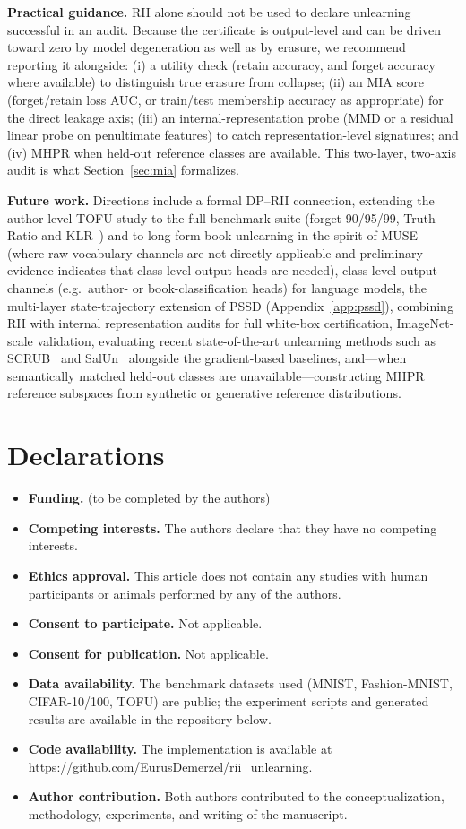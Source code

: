 \documentclass[smallextended]{svjour3}       %
\begin{document}
\textbf{Practical guidance.} RII alone should not be used to declare unlearning successful in an audit. Because the certificate is output-level and can be driven toward zero by model degeneration as well as by erasure, we recommend reporting it alongside: (i) a utility check (retain accuracy, and forget accuracy where available) to distinguish true erasure from collapse; (ii) an MIA score (forget/retain loss AUC, or train/test membership accuracy as appropriate) for the direct leakage axis; (iii) an internal-representation probe (MMD or a residual linear probe on penultimate features) to catch representation-level signatures; and (iv) MHPR when held-out reference classes are available. This two-layer, two-axis audit is what Section~\ref{sec:mia} formalizes.

\textbf{Future work.} Directions include a formal DP--RII connection, extending the author-level TOFU study to the full benchmark suite (forget 90/95/99, Truth Ratio and KLR~\cite{maini2024tofu}) and to long-form book unlearning in the spirit of MUSE~\cite{shi2024muse} (where raw-vocabulary channels are not directly applicable and preliminary evidence indicates that class-level output heads are needed), class-level output channels (e.g.\ author- or book-classification heads) for language models, the multi-layer state-trajectory extension of PSSD (Appendix~\ref{app:pssd}), combining RII with internal representation audits for full white-box certification, ImageNet-scale validation, evaluating recent state-of-the-art unlearning methods such as SCRUB~\cite{kurmanji2023scrub} and SalUn~\cite{fan2024salun} alongside the gradient-based baselines, and---when semantically matched held-out classes are unavailable---constructing MHPR reference subspaces from synthetic or generative reference distributions.

\section*{Declarations}
\begin{itemize}
\item \textbf{Funding.} (to be completed by the authors)
\item \textbf{Competing interests.} The authors declare that they have no competing interests.
\item \textbf{Ethics approval.} This article does not contain any studies with human participants or animals performed by any of the authors.
\item \textbf{Consent to participate.} Not applicable.
\item \textbf{Consent for publication.} Not applicable.
\item \textbf{Data availability.} The benchmark datasets used (MNIST, Fashion-MNIST, CIFAR-10/100, TOFU) are public; the experiment scripts and generated results are available in the repository below.
\item \textbf{Code availability.} The implementation is available at \url{https://github.com/EurusDemerzel/rii_unlearning}.
\item \textbf{Author contribution.} Both authors contributed to the conceptualization, methodology, experiments, and writing of the manuscript.
\end{itemize}
\end{document}
